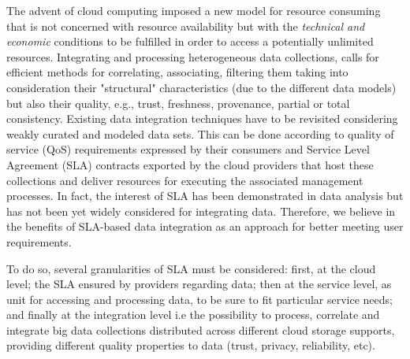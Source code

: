 %


\color{black}
The advent of cloud computing imposed a new model for resource consuming that is not concerned
 with resource availability but with the \textit{technical and economic} conditions to be fulfilled in order to access a potentially unlimited resources. Integrating and processing heterogeneous data collections, calls for efficient methods for correlating, associating, filtering them taking into consideration their "structural" characteristics (due to the different data models) but also their quality, e.g., trust, freshness, provenance, partial or total consistency. 
Existing data integration techniques have to be revisited considering weakly curated and modeled data sets. This can be done according to quality of service (QoS) requirements expressed by their consumers and Service Level Agreement (SLA) contracts exported by the cloud providers that host  these collections and deliver resources for executing the associated management processes.
In fact,  the interest of SLA has been demonstrated  in data analysis but has not been yet widely considered for integrating data. Therefore, we believe in the benefits of SLA-based data integration as an approach for better meeting  user requirements.

To do so, several granularities of SLA must be considered: first, at the cloud level; the SLA ensured by providers regarding data; then at the service level, as unit for accessing and processing data, to be sure to fit particular service needs; and finally at the integration level i.e the possibility to process, correlate and integrate big data collections distributed across different cloud storage supports, providing different quality properties to data (trust, privacy, reliability, etc).


